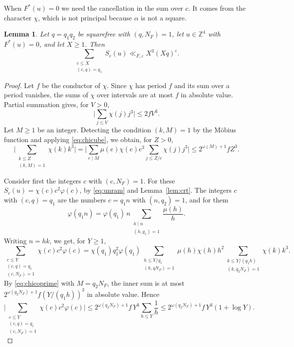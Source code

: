 \documentclass[11pt]{amsart}
\numberwithin{equation}{section}
\numberwithin{figure}{section}
\newtheorem{lemma}{Lemma}[section]
\theoremstyle{definition}
\newcommand{\Z}{\mathbb{Z}}
\newcommand{\eps}{\varepsilon}
\begin{document}
When $F^*(u)=0$ we need the cancellation in the sum over $c$. It
comes from the character $\chi$, which is not principal because
$\alpha$ is not a square.

\begin{lemma}\label{lem:conemod}
Let $q=q_1q_2$ be squarefree with $(q,N_F)=1$, let $u\in\Z^4$ with
$F^*(u)=0$, and let $X\ge1$. Then
\begin{equation}\label{eq:conemod}
 \sum_{\substack{c\le X\\(c,q)=q_1}}S_c(u)\ll_{F,\eps}X^3(Xq)^\eps.
\end{equation}
\end{lemma}

\begin{proof}
Let $f$ be the conductor of $\chi$. Since $\chi$ has period $f$ and
its sum over a period vanishes, the sums of $\chi$ over intervals are
at most $f$ in absolute value. Partial summation gives, for $V>0$,
\begin{equation}\label{eq:chicube}
 \bigg|\sum_{j\le V}\chi(j)j^3\bigg|\le2fV^3.
\end{equation}
Let $M\ge1$ be an integer. Detecting the condition $(k,M)=1$ by the
M\"obius function and applying \eqref{eq:chicube}, we obtain, for
$Z>0$,
\begin{equation}\label{eq:chicoprime}
 \bigg|\sum_{\substack{k\le Z\\(k,M)=1}}\chi(k)k^3\bigg|
 =\bigg|\sum_{e\mid M}\mu(e)\chi(e)e^3\sum_{j\le Z/e}\chi(j)j^3\bigg|
 \le2^{\omega(M)+1}fZ^3.
\end{equation}

Consider first the integers $c$ with $(c,N_F)=1$. For these
$S_c(u)=\chi(c)c^2\varphi(c)$, by \eqref{eq:unram} and
Lemma~\ref{lem:crt}. The integers $c$ with $(c,q)=q_1$ are the
numbers $c=q_1n$ with $(n,q_2)=1$, and for them
\[
 \varphi(q_1n)=\varphi(q_1)\,n\sum_{\substack{h\mid n\\(h,q_1)=1}}\frac{\mu(h)}h.
\]
Writing $n=hk$, we get, for $Y\ge1$,
\[
 \sum_{\substack{c\le Y\\(c,q)=q_1\\(c,N_F)=1}}\chi(c)c^2\varphi(c)
 =\chi(q_1)q_1^2\varphi(q_1)
 \sum_{\substack{h\le Y/q_1\\(h,qN_F)=1}}\mu(h)\chi(h)h^2
 \sum_{\substack{k\le Y/(q_1h)\\(k,q_2N_F)=1}}\chi(k)k^3.
\]
By \eqref{eq:chicoprime} with $M=q_2N_F$, the inner sum is at most
$2^{\omega(q_2N_F)+1}f(Y/(q_1h))^3$ in absolute value. Hence
\begin{equation}\label{eq:conegood}
 \bigg|\sum_{\substack{c\le Y\\(c,q)=q_1\\(c,N_F)=1}}\chi(c)c^2\varphi(c)\bigg|
 \le2^{\omega(q_2N_F)+1}f\,Y^3\sum_{h\le Y}\frac1h
 \le2^{\omega(q_2N_F)+1}f\,Y^3(1+\log Y).
\end{equation}


\end{proof}
\end{document}
